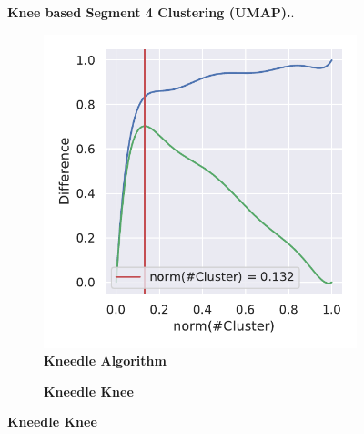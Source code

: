 \begin{figure}[!hbt]
\begin{subfigure}[b]{0.475\textwidth}
    \end{subfigure}
    \caption[Knee based Segment 4 Clustering (\Acrshort{UMAP})]{\textbf{Knee based Segment 4 Clustering (\Acrshort{UMAP}).}.}
    \label{fig:UMAP_Cluster_Knee_4}
\end{figure}

\begin{figure}[!hbt]
    \centering
    \begin{subfigure}[b]{0.475\textwidth}
        \caption[Kneedle Algorithm]{\textbf{Kneedle Algorithm}}
        \label{subfig:PCA_Cluster_Knee_Kneedle_4}            \includegraphics[width=\textwidth]{PCA/Cluster_Knee_Segment_4.pdf}
    \end{subfigure}
    \hfill
    \begin{subfigure}[b]{0.475\textwidth}
        \caption[Kneedle Knee]{\textbf{Kneedle Knee}}

\end{subfigure}
\end{figure}
